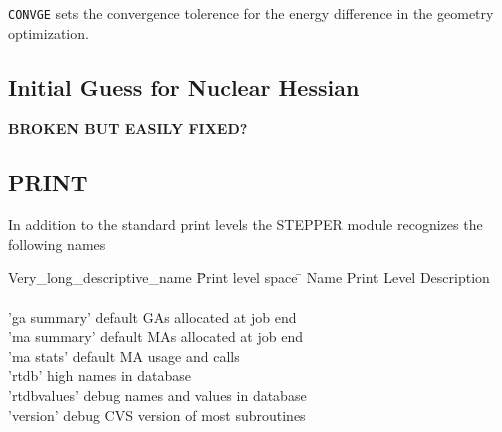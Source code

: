 \verb+CONVGE+ sets the convergence tolerence for the energy difference
in the geometry optimization.  


\subsection{Initial Guess for Nuclear Hessian}

{\bf BROKEN BUT EASILY FIXED?}

\subsection{PRINT}

In addition to the standard print levels the STEPPER module recognizes
the following names
\begin{tabbing}
  Very\_long\_descriptive\_name \= Print level space \= \kill
  Name                   \> Print Level \> Description \\
                         \>        \> \\
 'ga summary' \>   default  \> GAs allocated at job end \\
 'ma summary' \>   default  \> MAs allocated at job end \\
 'ma stats'   \>   default  \> MA usage and calls \\
 'rtdb'       \>   high     \> names in database \\
 'rtdbvalues' \>   debug    \> names and values in database \\
 'version'    \>   debug    \> CVS version of most subroutines
\end{tabbing}
